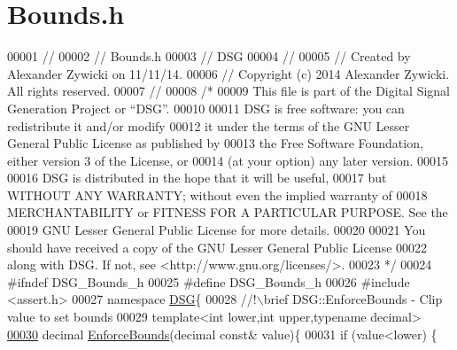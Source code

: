 \hypertarget{_bounds_8h_source}{\section{Bounds.\+h}
\label{_bounds_8h_source}
}

\begin{DoxyCode}
00001 \textcolor{comment}{//}
00002 \textcolor{comment}{//  Bounds.h}
00003 \textcolor{comment}{//  DSG}
00004 \textcolor{comment}{//}
00005 \textcolor{comment}{//  Created by Alexander Zywicki on 11/11/14.}
00006 \textcolor{comment}{//  Copyright (c) 2014 Alexander Zywicki. All rights reserved.}
00007 \textcolor{comment}{//}
00008 \textcolor{comment}{/*}
00009 \textcolor{comment}{ This file is part of the Digital Signal Generation Project or “DSG”.}
00010 \textcolor{comment}{}
00011 \textcolor{comment}{ DSG is free software: you can redistribute it and/or modify}
00012 \textcolor{comment}{ it under the terms of the GNU Lesser General Public License as published by}
00013 \textcolor{comment}{ the Free Software Foundation, either version 3 of the License, or}
00014 \textcolor{comment}{ (at your option) any later version.}
00015 \textcolor{comment}{}
00016 \textcolor{comment}{ DSG is distributed in the hope that it will be useful,}
00017 \textcolor{comment}{ but WITHOUT ANY WARRANTY; without even the implied warranty of}
00018 \textcolor{comment}{ MERCHANTABILITY or FITNESS FOR A PARTICULAR PURPOSE.  See the}
00019 \textcolor{comment}{ GNU Lesser General Public License for more details.}
00020 \textcolor{comment}{}
00021 \textcolor{comment}{ You should have received a copy of the GNU Lesser General Public License}
00022 \textcolor{comment}{ along with DSG.  If not, see <http://www.gnu.org/licenses/>.}
00023 \textcolor{comment}{ */}
00024 \textcolor{preprocessor}{#ifndef DSG\_Bounds\_h}
00025 \textcolor{preprocessor}{#define DSG\_Bounds\_h}
00026 \textcolor{preprocessor}{#include <assert.h>}
00027 \textcolor{keyword}{namespace }\hyperlink{namespace_d_s_g}{DSG}\{\textcolor{comment}{}
00028 \textcolor{comment}{    //!\(\backslash\)brief DSG::EnforceBounds - Clip value to set bounds}
00029 \textcolor{comment}{}    \textcolor{keyword}{template}<\textcolor{keywordtype}{int} lower,\textcolor{keywordtype}{int} upper,\textcolor{keyword}{typename} decimal>
\hypertarget{_bounds_8h_source_l00030}{}\hyperlink{namespace_d_s_g_a8bc6af8f213f4f713bd634ec8545491c}{00030}     decimal \hyperlink{namespace_d_s_g_a8bc6af8f213f4f713bd634ec8545491c}{EnforceBounds}(decimal \textcolor{keyword}{const}& value)\{
00031         \textcolor{keywordflow}{if} (value<lower) \{

\end{DoxyCode}
